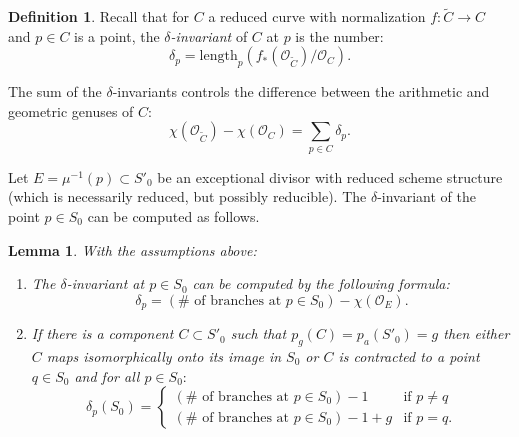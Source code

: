 \documentclass[JEP,XML,SOM,Unicode,NoFloatCountersInSection,published]{cedram}
\theoremstyle{plain}
\newtheorem{lemma}[theorem]{Lemma}
\theoremstyle{definition}
\newtheorem{definition}[theorem]{Definition}
\newcommand\Oc{{\mathcal O}}
\newcommand\length{{\mathrm{length}}}
\newcommand\Ct{{\widetilde{C}}}
\begin{document}
\begin{definition}\label{defn:delta}
Recall that for $C$ a reduced curve with normalization $f:\Ct\to C$ and $p\in C$ is a point, the \textit{$\delta$-invariant} of $C$ at $p$ is the number:
\[
\delta_p=\length_p(f_*(\Oc_{\Ct})/\Oc_C).
\]
\end{definition}

The sum of the $\delta$-invariants controls the difference between the arithmetic and geometric genuses of $C$:
\[
\chi(\Oc_{\Ct})-\chi(\Oc_C) = \sum_{p\in C} \delta_p.
\]

Let $E=\mu^{-1}(p)\subset S'_0$ be an exceptional divisor with reduced scheme structure (which is necessarily reduced, but possibly reducible). The $\delta$-invariant of the point $p\in S_0$ can be computed as follows.

\pagebreak[2]
\begin{lemma}\label{deltabranches}
With the assumptions above:
\begin{enumerate}
\item\label{deltabranches1} The $\delta$-invariant at $p\in S_0$ can be computed by the following formula:
\[
\delta_p=(\#\text{ of branches at }p\in S_0)-\chi(\Oc_E).
\]
\item\label{deltabranches2} If there is a component $C\subset S'_0$ such that $p_g(C)=p_a(S'_0)=g$ then either $C$ maps isomorphically onto its image in $S_0$ or $C$ is contracted to a point $q\in S_0$ and for all $p\in S_0:$
\[
\delta_p(S_0) =
\begin{cases}(\#\text{ of branches at }p\in S_0)-1&\text{if $p\ne q$}\\ (\#\text{ of branches at }p\in S_0)-1+g&\text{if $p=q$.}\end{cases}
\]
\end{enumerate}
\end{lemma}
\end{document}
